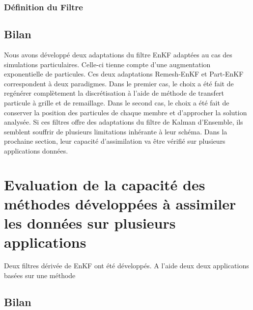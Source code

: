 \subsubsection{Définition du Filtre}

\subsubsection{}

\subsection{Bilan}

Nous avons développé deux adaptations du filtre EnKF adaptées au cas des simulations particulaires. Celle-ci tienne compte d'une augmentation exponentielle de particules.
Ces deux adaptations Remesh-EnKF et Part-EnKF correspondent à deux paradigmes. Dans le premier cas, le choix a été fait de regénérer complètement la discrétisation à l'aide de méthode de transfert particule à grille et de remaillage. Dans le second cas, le choix a été fait de conserver la position des particules de chaque membre et d'approcher la solution analysée.
Si ces filtres offre des adaptations du filtre de Kalman d'Ensemble, ils semblent souffrir de plusieurs limitations inhérante à leur schéma. Dans la prochaine section, leur capacité d'assimilation va être vérifié sur plusieurs applications données.

\section{Evaluation de la capacité des méthodes développées à assimiler les données sur plusieurs applications}

Deux filtres dérivée de EnKF ont été développés. A l'aide deux deux applications basées sur une méthode


\subsection{Bilan}